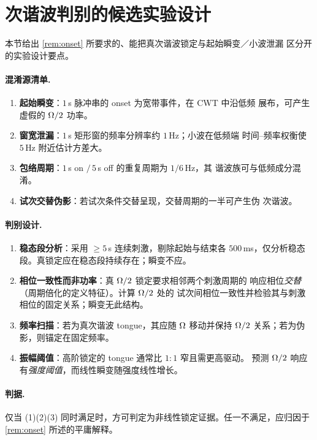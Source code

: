 \section{次谐波判别的候选实验设计}
\label{app:subharm}

本节给出 \cref{rem:onset} 所要求的、能把真次谐波锁定与起始瞬变／小波泄漏
区分开的实验设计要点。

\paragraph{混淆源清单.}
\begin{enumerate}[leftmargin=2.2em,itemsep=2pt]
\item \textbf{起始瞬变}：$1\,$s 脉冲串的 onset 为宽带事件，在 CWT 中沿低频
      展布，可产生虚假的 $\Omega/2$ 功率。
\item \textbf{窗宽泄漏}：$1\,$s 矩形窗的频率分辨率约 $1\,$Hz；小波在低频端
      时间--频率权衡使 $5\,$Hz 附近估计方差大。
\item \textbf{包络周期}：$1\,$s on $/\,5\,$s off 的重复周期为 $1/6\,$Hz，其
      谐波族可与低频成分混淆。
\item \textbf{试次交替伪影}：若试次条件交替呈现，交替周期的一半可产生伪
      次谐波。
\end{enumerate}

\paragraph{判别设计.}
\begin{enumerate}[leftmargin=2.2em,itemsep=2pt]
\item \textbf{稳态段分析}：采用 $\ge5\,$s 连续刺激，剔除起始与结束各
      $500\,$ms，仅分析稳态段。真锁定应在稳态段持续存在；瞬变不应。
\item \textbf{相位一致性而非功率}：真 $\Omega/2$ 锁定要求相邻两个刺激周期的
      响应相位\emph{交替}（周期倍化的定义特征）。计算 $\Omega/2$ 处的
      试次间相位一致性并检验其与刺激相位的固定关系；瞬变无此结构。
\item \textbf{频率扫描}：若为真次谐波 tongue，其应随 $\Omega$ 移动并保持
      $\Omega/2$ 关系；若为伪影，则锚定在固定频率。
\item \textbf{振幅阈值}：高阶锁定的 tongue 通常比 $1{:}1$ 窄且需更高驱动。
      预测 $\Omega/2$ 响应有\emph{强度阈值}，而线性瞬变随强度线性增长。
\end{enumerate}

\paragraph{判据.}
仅当 (1)(2)(3) 同时满足时，方可判定为非线性锁定证据。任一不满足，应归因于
\cref{rem:onset} 所述的平庸解释。
